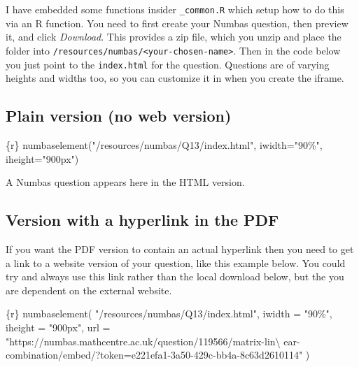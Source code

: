 \documentclass[
  a4paper,
  DIV=11,
  numbers=noendperiod,
  oneside]{scrreport}
\newenvironment{Shaded}{\begin{snugshade}}{\end{snugshade}}
\newcommand{\AttributeTok}[1]{\textcolor[rgb]{0.40,0.45,0.13}{#1}}
\newcommand{\FunctionTok}[1]{\textcolor[rgb]{0.28,0.35,0.67}{#1}}
\newcommand{\InformationTok}[1]{\textcolor[rgb]{0.37,0.37,0.37}{#1}}
\newcommand{\NormalTok}[1]{\textcolor[rgb]{0.00,0.23,0.31}{#1}}
\newcommand{\StringTok}[1]{\textcolor[rgb]{0.13,0.47,0.30}{#1}}
\begin{document}
I have embedded some functions insider \texttt{\_common.R} which setup
how to do this via an R function. You need to first create your Numbas
question, then preview it, and click \emph{Download}. This provides a
zip file, which you unzip and place the folder into
\texttt{/resources/numbas/\textless{}your-chosen-name\textgreater{}}.
Then in the code below you just point to the \texttt{index.html} for the
question. Questions are of varying heights and widths too, so you can
customize it in when you create the iframe.

\subsection{Plain version (no web
version)}\label{plain-version-no-web-version}

\begin{Shaded}
\begin{Highlighting}[]
\InformationTok{\textasciigrave{}\textasciigrave{}\textasciigrave{}\{r\}}
\FunctionTok{numbaselement}\NormalTok{(}\StringTok{"/resources/numbas/Q13/index.html"}\NormalTok{, }\AttributeTok{iwidth=}\StringTok{"90\%"}\NormalTok{, }\AttributeTok{iheight=}\StringTok{"900px"}\NormalTok{)}
\InformationTok{\textasciigrave{}\textasciigrave{}\textasciigrave{}}
\end{Highlighting}
\end{Shaded}

A Numbas question appears here in the HTML version.

\subsection{Version with a hyperlink in the
PDF}\label{version-with-a-hyperlink-in-the-pdf}

If you want the PDF version to contain an actual hyperlink then you need
to get a link to a website version of your question, like this example
below. You could try and always use this link rather than the local
download below, but the you are dependent on the external website.

\begin{Shaded}
\begin{Highlighting}[]
\InformationTok{\textasciigrave{}\textasciigrave{}\textasciigrave{}\{r\}}
\FunctionTok{numbaselement}\NormalTok{(}
  \StringTok{"/resources/numbas/Q13/index.html"}\NormalTok{,}
  \AttributeTok{iwidth =} \StringTok{"90\%"}\NormalTok{,}
  \AttributeTok{iheight =} \StringTok{"900px"}\NormalTok{,}
  \AttributeTok{url =} \StringTok{"https://numbas.mathcentre.ac.uk/question/119566/matrix{-}lin\textbackslash{}}
\StringTok{  ear{-}combination/embed/?token=e221efa1{-}3a50{-}429c{-}bb4a{-}8c63d2610114"}
\NormalTok{)}
\InformationTok{\textasciigrave{}\textasciigrave{}\textasciigrave{}}
\end{Highlighting}
\end{Shaded}
\end{document}
